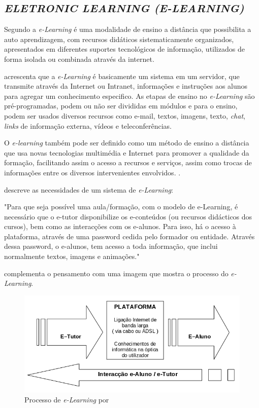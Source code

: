 \newpage
\subsection{\textit{ELETRONIC LEARNING (E-LEARNING)}}
Segundo  a \textit{e-Learning} é uma modalidade de ensino a distância que possibilita a auto aprendizagem, com recursos didáticos sistematicamente organizados, apresentados em diferentes suportes tecnológicos de informação, utilizados de forma isolada ou combinada através da internet.
\par
{} acrescenta que a \textit{e-Learning} é basicamente um sistema em um servidor, que transmite através da Internet ou Intranet, informações e instruções aos alunos para agregar um conhecimento especifico. As etapas de ensino no \textit{e-Learning} são pré-programadas, podem ou não ser divididas em módulos e para o ensino, podem ser usados diversos recursos como e-mail, textos, imagens, texto, \textit{chat}, \textit{links} de informação externa, vídeos e teleconferências.
\par
O \textit{e-learning} também pode ser definido como um método de ensino a distância que usa novas tecnologias multimédia e Internet para promover a qualidade da formação, facilitando assim o acesso a recursos e serviços, assim como trocas de informações entre os diversos intervenientes envolvidos. \cite{spi}.
\par
\cite[p.~3]{barbosa} descreve as necessidades de um sistema de \textit{e-Learning}:
\begin{citacao}
  "Para que seja possível uma aula/formação, com o modelo de e-Learning, é necessário que o e-tutor disponibilize os e-conteúdos (ou recursos didácticos dos cursos), bem como as interacções com os e-alunos. Para isso, há o acesso à plataforma, através de uma password cedida pelo formador ou entidade. Através dessa password, o e-alunos, tem acesso a toda informação, que inclui normalmente textos, imagens e animações."
\end{citacao}
 complementa o pensamento com uma imagem que mostra o processo do \textit{e-Learning}.

\begin{figure}[h]
  \centering
  \label{fig:e-learning-caracterização-barbosa}
  \includegraphics[keepaspectratio=true,scale=0.6]{figuras/e-learning-barbosa.png}
  \caption{Processo de \textit{e-Learning} por }
\end{figure}

